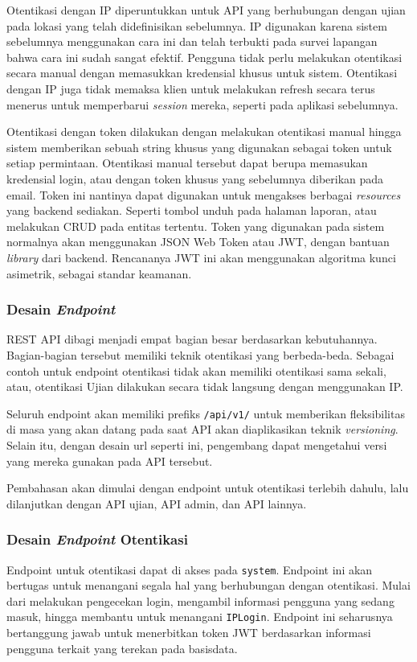     Otentikasi dengan IP diperuntukkan untuk API yang berhubungan dengan ujian
    pada lokasi yang telah didefinisikan sebelumnya. IP digunakan karena sistem
    sebelumnya menggunakan cara ini dan telah terbukti pada survei lapangan
    bahwa cara ini sudah sangat efektif. Pengguna tidak perlu melakukan
    otentikasi secara manual dengan memasukkan kredensial khusus untuk sistem.
    Otentikasi dengan IP juga tidak memaksa klien untuk melakukan refresh secara
    terus menerus untuk memperbarui \textit{session} mereka, seperti pada
    aplikasi sebelumnya.
    
    Otentikasi dengan token dilakukan dengan melakukan otentikasi manual hingga
    sistem memberikan sebuah string khusus yang digunakan sebagai token untuk
    setiap permintaan. Otentikasi manual tersebut dapat berupa memasukan
    kredensial login, atau dengan token khusus yang sebelumnya diberikan pada
    email. Token ini nantinya dapat digunakan untuk mengakses berbagai
    \textit{resources} yang backend sediakan. Seperti tombol unduh pada halaman
    laporan, atau melakukan CRUD pada entitas tertentu. Token yang digunakan
    pada sistem normalnya akan menggunakan JSON Web Token atau JWT, dengan
    bantuan \textit{library} dari backend. Rencananya JWT ini akan menggunakan
    algoritma kunci asimetrik, sebagai standar keamanan.
    
\subsubsection{Desain \textit{Endpoint}} REST API dibagi menjadi empat bagian
    besar berdasarkan kebutuhannya. Bagian-bagian tersebut memiliki teknik
    otentikasi yang berbeda-beda. Sebagai contoh untuk endpoint otentikasi tidak
    akan memiliki otentikasi sama sekali, atau, otentikasi Ujian dilakukan
    secara tidak langsung dengan menggunakan IP. 
    
    Seluruh endpoint akan memiliki prefiks \texttt{/api/v1/} untuk memberikan
    fleksibilitas di masa yang akan datang pada saat API akan diaplikasikan
    teknik \textit{versioning}. Selain itu, dengan desain url seperti ini,
    pengembang dapat mengetahui versi yang mereka gunakan pada API tersebut.
    
    Pembahasan akan dimulai dengan endpoint untuk otentikasi terlebih dahulu,
    lalu dilanjutkan dengan API ujian, API admin, dan API lainnya.
    
\subsubsection{Desain \textit{Endpoint} Otentikasi} Endpoint untuk otentikasi
    dapat di akses pada \texttt{system}. Endpoint ini akan bertugas untuk
    menangani segala hal yang berhubungan dengan otentikasi. Mulai dari
    melakukan pengecekan login, mengambil informasi pengguna yang sedang masuk,
    hingga membantu untuk menangani \texttt{IPLogin}. Endpoint ini seharusnya
    bertanggung jawab untuk menerbitkan token JWT berdasarkan informasi pengguna
    terkait yang terekan pada basisdata.
    
